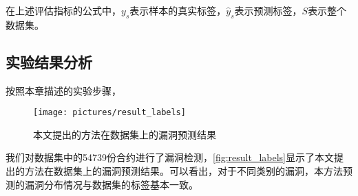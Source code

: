 在上述评估指标的公式中，$y_s$表示样本的真实标签，$\hat{y}_s$表示预测标签，$S$表示整个数据集。

\subsection{实验结果分析}
\label{sec:实验结果分析}
按照本章描述的实验步骤，
\begin{figure}[htbp]
    \centering
    \texttt{[image: pictures/result\_labels]}
    \caption{\label{fig:result_labels}本文提出的方法在数据集上的漏洞预测结果}
\end{figure}
我们对数据集中的\num{54739}份合约进行了漏洞检测，\autoref{fig:result_labels}显示了本文提出的方法在数据集上的漏洞预测结果。可以看出，对于不同类别的漏洞，本方法预测的漏洞分布情况与数据集的标签基本一致。


